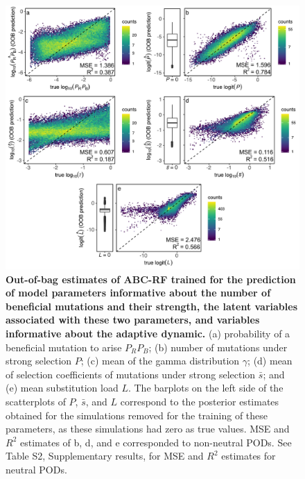 \documentclass[a4paper, 12pt]{article}
\begin{document}
\begin{figure}[ht]
  \centering
  \includegraphics[width=1\textwidth]{Figures/FigureS2_oob_plots_selection.pdf}
  \small\caption{\textbf{Out-of-bag estimates of ABC-RF trained for the prediction of model parameters informative about the number of beneficial mutations and their strength, the latent variables associated with these two parameters, and variables informative about the adaptive dynamic.} (a) probability of a beneficial mutation to arise $P_RP_B$; (b) number of mutations under strong selection $P$; (c)  mean of the gamma distribution $\gamma$; (d) mean of selection coefficients of mutations under strong selection $\bar{s}$; and (e) mean substitution load $L$. The barplots on the left side of the scatterplots of $P$, $\bar{s}$, and $L$ correspond to the posterior estimates obtained for the simulations removed for the training of these parameters, as these simulations had zero as true values. MSE and $R^2$ estimates of b, d, and e corresponded to non-neutral PODs. See Table S2, Supplementary results, for MSE and $R^2$ estimates for neutral PODs.}
  \label{fig:supple_oob_sel}
\end{figure}
\end{document}
